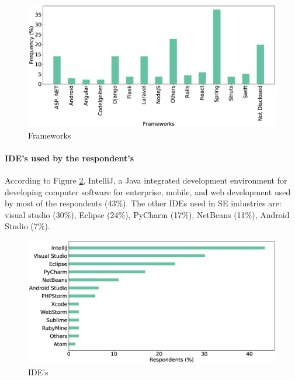 \begin{figure}[h]
\centering
  \includegraphics[scale=0.18]{Figures/Respondents_frameworks}
  \caption{Frameworks}
  \label{fig:frameworks}
\end{figure}


\paragraph{IDE's used by the respondent's}
According to Figure \ref{fig:IDEs}, IntelliJ, a Java integrated development environment for developing computer software for enterprise, mobile, and web development used by most of the respondents (43\%). The other IDEs used in SE industries are: visual studio (30\%), Eclipse (24\%), PyCharm (17\%), NetBeans (11\%), Android Studio (7\%).

\begin{figure}[htbp]
\centering
  \includegraphics[scale=0.18]{Figures/Respondents_IDEs}
  \caption{IDE's}
  \label{fig:IDEs}
\end{figure}
